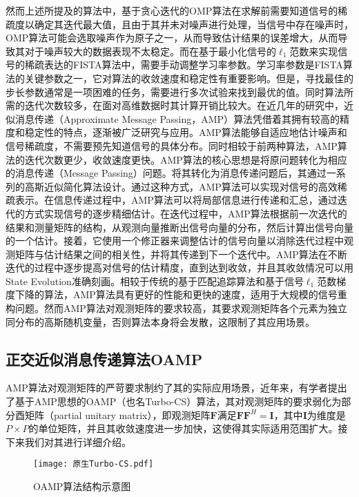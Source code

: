 \documentclass{xdupgthesis}
\begin{document}
然而上述所提及的算法中，基于贪心迭代的OMP算法在求解前需要知道信号的稀疏度以确定其迭代最大值，且由于其并未对噪声进行处理，当信号中存在噪声时，OMP算法可能会选取噪声作为原子之一，从而导致估计结果的误差增大，从而导致其对于噪声较大的数据表现不太稳定。而在基于最小化信号的$\ell_1$范数来实现信号的稀疏表达的FISTA算法中，需要手动调整学习率参数。学习率参数是FISTA算法的关键参数之一，它对算法的收敛速度和稳定性有重要影响。但是，寻找最佳的步长参数通常是一项困难的任务，需要进行多次试验来找到最优的值。同时算法所需的迭代次数较多，在面对高维数据时其计算开销比较大。在近几年的研究中，近似消息传递（Approximate Message Passing，AMP）\parencite{donoho2009message}算法凭借着其拥有较高的精度和稳定性的特点，逐渐被广泛研究与应用。AMP算法能够自适应地估计噪声和信号稀疏度，不需要预先知道信号的具体分布。同时相较于前两种算法，AMP算法的迭代次数更少，收敛速度更快。AMP算法的核心思想是将原问题转化为相应的消息传递（Message Passing）问题。将其转化为消息传递问题后，其通过一系列的高斯近似简化算法设计。通过这种方式，AMP算法可以实现对信号的高效稀疏表示。在信息传递过程中，AMP算法可以将局部信息进行传递和汇总，通过迭代的方式实现信号的逐步精细估计。在迭代过程中，AMP算法根据前一次迭代的结果和测量矩阵的结构，从观测向量推断出信号向量的分布，然后计算出信号向量的一个估计。接着，它使用一个修正器来调整估计的信号向量以消除迭代过程中观测矩阵与估计结果之间的相关性，并将其传递到下一个迭代中。AMP算法在不断迭代的过程中逐步提高对信号的估计精度，直到达到收敛，并且其收敛情况可以用State Evolution准确刻画。相较于传统的基于匹配追踪算法和基于信号$\ell_1$范数梯度下降的算法，AMP算法具有更好的性能和更快的速度，适用于大规模的信号重构问题。然而AMP算法对观测矩阵的要求较高，其要求观测矩阵各个元素为独立同分布的高斯随机变量，否则算法本身将会发散，这限制了其应用场景。

\subsection{正交近似消息传递算法OAMP}
AMP算法对观测矩阵的严苛要求制约了其的实际应用场景，近年来，有学者提出了基于AMP思想的OAMP（也名Turbo-CS）\parencite{ma2014turbo,ma2015performance,ma2017orthogonal}算法，其对观测矩阵的要求弱化为部分酉矩阵（partial unitary matrix），即观测矩阵$\mathbf{F}$满足$\mathbf{F}\mathbf{F}^H = \mathbf{I}$，其中$\mathbf{I}$为维度是$P \times P$的单位矩阵，并且其收敛速度进一步加快，这使得其实际适用范围扩大。接下来我们对其进行详细介绍。

\begin{figure}
    \centering
    \texttt{[image: 原生Turbo-CS.pdf]}
    \caption{OAMP算法结构示意图}
    \label{原生Turbo-CS}
\end{figure}
\end{document}
